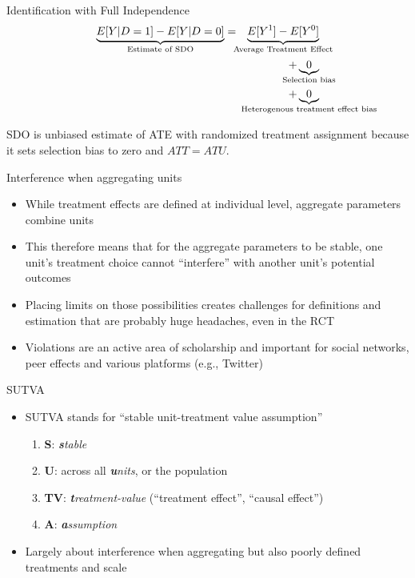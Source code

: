 \documentclass{beamer}
\begin{document}
\begin{frame}[plain]

  \begin{block}{Identification with Full Independence}
    \begin{eqnarray*}
      \underbrace{E[Y | D=1] - E[Y | D=0]}_{ \mathclap{\text{Estimate of SDO}}}&=& \underbrace{E[Y^1] - E[Y^0]}_{ \mathclap{\text{Average Treatment Effect}}} \\
    &&+ \underbrace{0}_{ \mathclap{\text{Selection bias}}}  \\
    && + \underbrace{0}_{ \mathclap{\text{Heterogenous treatment effect bias}}}
    \end{eqnarray*}
  \end{block}
  
  SDO is unbiased estimate of ATE with randomized treatment assignment because it sets selection bias to zero and $ATT=ATU$.



\end{frame}




\begin{frame}{Interference when aggregating units}

\begin{itemize}
\item While treatment effects are defined at individual level, aggregate parameters combine units
\item This therefore means that for the aggregate parameters to be stable, one unit's treatment choice cannot ``interfere'' with another unit's potential outcomes
\item Placing limits on those possibilities creates challenges for definitions and estimation that are probably huge headaches, even in the RCT
\item Violations are an active area of scholarship and important for social networks, peer effects and various platforms (e.g., Twitter)
\end{itemize}

\end{frame}

\begin{frame}{SUTVA}

  \begin{itemize}
    \item SUTVA stands for ``stable unit-treatment value assumption''
          \begin{enumerate}
            \item \textbf{S}: \emph{\textbf{s}table}
            \item \textbf{U}: across all \emph{\textbf{u}nits}, or the population
            \item \textbf{TV}: \emph{\textbf{t}reatment-value} (``treatment effect'', ``causal effect'')
            \item \textbf{A}: \emph{\textbf{a}ssumption}
          \end{enumerate}
    \item Largely about interference when aggregating but also poorly defined treatments and scale
  \end{itemize}
\end{frame}
\end{document}
